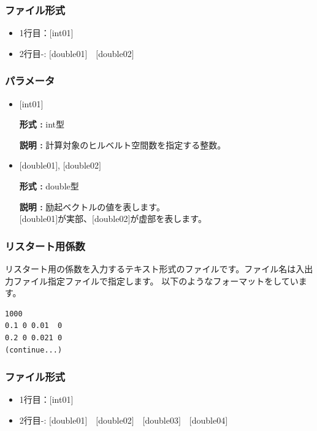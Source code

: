 \documentclass[12pt,titlepage]{jarticle}
\begin{document}
\subsubsection{ファイル形式}
 \begin{itemize}
   \item  1行目：$[$int01$]$
   \item  2行目-: $[$double01$]$~~$[$double02$]$
  \end{itemize}
\subsubsection{パラメータ}
 \begin{itemize}

  \item  $[$int01$]$

 {\bf 形式 :} int型

{\bf 説明 :} 計算対象のヒルベルト空間数を指定する整数。
 
 \item  $[$double01$]$, $[$double02$]$

 {\bf 形式 :} double型 

{\bf 説明 :} 励起ベクトルの値を表します。\\
$[$double01$]$が実部、$[$double02$]$が虚部を表します。\\
\end{itemize}


\newpage
\subsubsection{リスタート用係数}\label{subsubsec:recoeff}
リスタート用の係数を入力するテキスト形式のファイルです。ファイル名は入出力ファイル指定ファイルで指定します。
以下のようなフォーマットをしています。
\\
\begin{minipage}{10cm}
\begin{screen}
\begin{verbatim}
1000
0.1 0 0.01  0
0.2 0 0.021 0
(continue...)
\end{verbatim}
\end{screen}
\end{minipage}


\subsubsection{ファイル形式}
 \begin{itemize}
   \item  1行目：$[$int01$]$
   \item  2行目-: $[$double01$]$~~$[$double02$]$~~$[$double03$]$~~$[$double04$]$
  \end{itemize}
\end{document}

